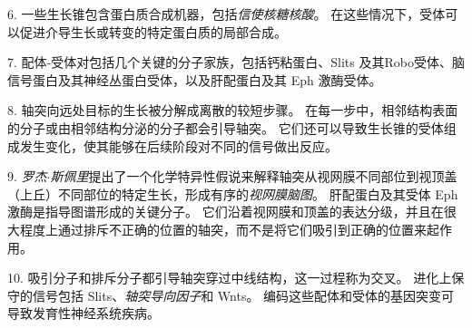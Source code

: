 6. 一些生长锥包含蛋白质合成机器，包括\textit{信使核糖核酸}。
在这些情况下，受体可以促进介导生长或转变的特定蛋白质的局部合成。


7. 配体-受体对包括几个关键的分子家族，包括钙粘蛋白、Slits 及其Robo受体、脑信号蛋白及其神经丛蛋白受体，以及肝配蛋白及其 Eph 激酶受体。


8. 轴突向远处目标的生长被分解成离散的较短步骤。 
在每一步中，相邻结构表面的分子或由相邻结构分泌的分子都会引导轴突。
它们还可以导致生长锥的受体组成发生变化，使其能够在后续阶段对不同的信号做出反应。


9. \textit{罗杰$\cdot$斯佩里}提出了一个化学特异性假说来解释轴突从视网膜不同部位到视顶盖（上丘）不同部位的特定生长，形成有序的\textit{视网膜脑图}。
肝配蛋白及其受体 Eph 激酶是指导图谱形成的关键分子。
它们沿着视网膜和顶盖的表达分级，并且在很大程度上通过排斥不正确的位置的轴突，而不是将它们吸引到正确的位置来起作用。


10. 吸引分子和排斥分子都引导轴突穿过中线结构，这一过程称为交叉。
进化上保守的信号包括 Slits、\textit{轴突导向因子}和 Wnts。
编码这些配体和受体的基因突变可导致发育性神经系统疾病。

